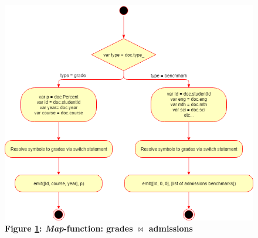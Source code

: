 \begin{figure}[H]
    \centering
    \begin{mdframed}
        \centering
        \includegraphics[scale=0.59]{./resources/figures/fig-mapfn-correlation-grades.png}
    \end{mdframed}
    \caption[\textit{Map}-function: \texorpdfstring{grades $\bowtie$ admissions}{Lg}]{\textbf{Figure \ref{fig-mapfn-correlation-grades}: \textit{Map}-function: \texorpdfstring{grades $\bowtie$ admissions}{Lg}}}
    \label{fig-mapfn-correlation-grades}
\end{figure}
